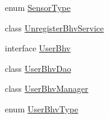 \begin{DoxyCompactItemize}
\item 
enum \hyperlink{enumlab_1_1davidahn_1_1appshuttle_1_1collect_1_1bhv_1_1_sensor_type}{\-Sensor\-Type}
\item 
class \hyperlink{classlab_1_1davidahn_1_1appshuttle_1_1collect_1_1bhv_1_1_unregister_bhv_service}{\-Unregister\-Bhv\-Service}
\item 
interface \hyperlink{interfacelab_1_1davidahn_1_1appshuttle_1_1collect_1_1bhv_1_1_user_bhv}{\-User\-Bhv}
\item 
class \hyperlink{classlab_1_1davidahn_1_1appshuttle_1_1collect_1_1bhv_1_1_user_bhv_dao}{\-User\-Bhv\-Dao}
\item 
class \hyperlink{classlab_1_1davidahn_1_1appshuttle_1_1collect_1_1bhv_1_1_user_bhv_manager}{\-User\-Bhv\-Manager}
\item 
enum \hyperlink{enumlab_1_1davidahn_1_1appshuttle_1_1collect_1_1bhv_1_1_user_bhv_type}{\-User\-Bhv\-Type}
\end{DoxyCompactItemize}
